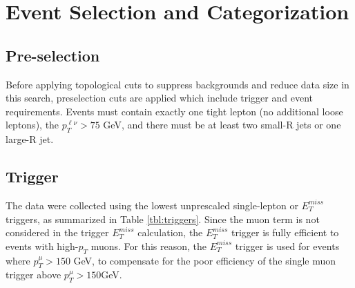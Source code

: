 \chapter{Event Selection and Categorization}

\section{Pre-selection}
Before applying topological cuts to suppress backgrounds and reduce data size in this search, preselection cuts are applied which include trigger and event requirements. Events must contain exactly one tight lepton (no additional loose leptons),  the $p_{T}^{\ell \nu} > 75$ GeV, and there must be at least two small-R jets or one large-R jet.
\section{Trigger}
The data were collected using the lowest unprescaled single-lepton or $E_{T}^{miss}$ triggers, as summarized in Table \ref{tbl:triggers}. Since the muon term is not considered in the trigger $E_{T}^{miss}$ calculation, the $E_{T}^{miss}$ trigger is fully efficient to events with high-$p_{T}$ muons. For this reason, the $E_{T}^{miss}$  trigger is used for events where $p_{T}^{\mu} > 150$ GeV, to compensate for the poor efficiency of the single muon trigger above $p_{T}^{\mu}>150$GeV. 


